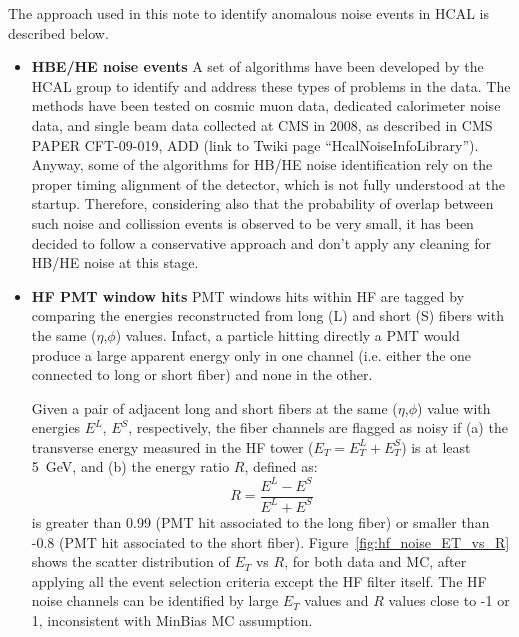 The approach used in this note to identify anomalous noise events in HCAL is described below.

\begin{itemize}
%
\item{\bf HBE/HE noise events} A set of algorithms have been developed by the HCAL group to 
identify and address these types of problems in the data. The methods have been tested on cosmic muon data, 
dedicated calorimeter noise data, and single beam data collected at CMS in 2008, 
as described in CMS PAPER CFT-09-019, ADD (link to Twiki page ``HcalNoiseInfoLibrary''). 
Anyway, some of the algorithms for HB/HE noise identification rely on the proper 
timing alignment of the detector, which is not fully understood at the startup.
Therefore, considering also that the probability of overlap between such noise and 
collission events is observed to be very small, it has been decided to follow a conservative approach and 
don't apply any cleaning for HB/HE noise at this stage.
%
\item{\bf HF PMT window hits} PMT windows hits within HF are tagged by comparing 
the energies reconstructed from long (L) and short (S) fibers with the same ($\eta$,$\phi$) values. 
Infact, a particle hitting directly a PMT would produce a large apparent energy only in one channel 
(i.e. either the one connected to long or short fiber) and none in the other.

Given a pair of adjacent long and short fibers at the same ($\eta$,$\phi$) value 
with energies $E^L$, $E^S$, respectively, the fiber channels are flagged as noisy if 
(a) the transverse energy measured in the HF tower ($E_T=E_T^L+E_T^S$) is at least 5~GeV, 
and (b) the energy ratio $R$, defined as:
%
\begin{equation}
R = \frac{E^L - E^S}{E^L + E^S}
\end{equation}
%
is greater than 0.99 (PMT hit associated to the long fiber) 
or smaller than -0.8 (PMT hit associated to the short fiber). 
Figure~\ref{fig:hf_noise_ET_vs_R} shows the scatter distribution of $E_T$ vs $R$, 
for both data and MC, after applying all the event selection criteria except 
the HF filter itself. The HF noise channels can be identified by 
large $E_T$ values and $R$ values close to -1 or 1, 
inconsistent with MinBias MC assumption.


\end{itemize}
